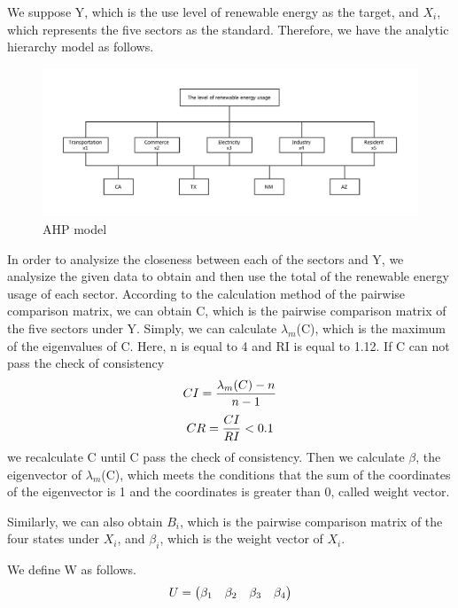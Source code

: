 \documentclass[a4paper,11pt]{article}
\begin{document}
\par We suppose Y, which is the use level of renewable energy as the target, and $X_i$, which represents the five sectors as the standard. Therefore, we have the analytic hierarchy model as follows.\cite{6}
\begin{figure}[!hptb] 
    \centering 
    \includegraphics[width=1.0\textwidth]{./Pic/AHP.pdf}
    \caption{AHP model}
\end{figure}
\par In order to analysize the closeness between each of the sectors and Y, we analysize the given data to obtain and then use the total of the renewable energy usage of each sector. According to the calculation method of the pairwise comparison matrix, we can obtain C, which is the pairwise comparison matrix of the five sectors under Y. Simply, we can calculate $\lambda_m$(C), which is the maximum of the eigenvalues of C. Here, n is equal to 4 and RI is equal to 1.12.\cite{6} If C can not pass the check of consistency
\begin{equation}
    \centering
    CI=\frac{ \lambda_m(C)-n }{ n-1 }
\end{equation}
\begin{equation}
        \centering
    CR=\frac{ CI }{ RI }<0.1 
\end{equation}
we recalculate C until C pass the check of consistency. Then we calculate $\beta$, the eigenvector of $\lambda_m$(C), which meets the conditions that the sum of the coordinates of the eigenvector is 1 and the coordinates is greater than 0, called weight vector.
\par Similarly, we can also obtain $B_i$, which is the pairwise comparison matrix of the four states under $X_i$, and $\beta_i$, which is the weight vector of $X_i$.
\par We define W as follows.
\begin{equation}
    \centering
U=\begin{pmatrix} \beta_1 & \beta_2 & \beta_3 & \beta_4\end{pmatrix}
\end{equation}
\end{document}
